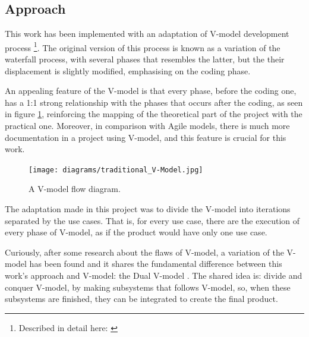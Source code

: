 \subsection{Approach}
This work has been implemented with an adaptation of V-model development process
\footnote{Described in detail here: \cite{mathur2010advancements}}.
The original version of this process is known as a variation of the waterfall process,
with several phases that resembles the latter,
but the their displacement is slightly modified,
emphasising on the coding phase.

An appealing feature of the V-model is that every phase,
before the coding one,
has a 1:1 strong relationship with the phases that occurs after the coding,
as seen in figure \ref{fig:v-model},
reinforcing the mapping of the theoretical part of the project with the practical one.
Moreover,
in comparison with Agile models,
there is much more documentation in a project using V-model,
and this feature is crucial for this work.

\begin{figure}[h]
    \centering
    \texttt{[image: diagrams/traditional\_V-Model.jpg]}
    \caption{A V-model flow diagram. \cite{vmodelCMU}}
    \label{fig:v-model}
\end{figure}

The adaptation made in this project was to divide the V-model into iterations separated by the use cases.
That is,
for every use case,
there are the execution of every phase of V-model,
as if the product would have only one use case.

Curiously,
after some research about the flaws of V-model,
a variation of the V-model has been found and it shares the fundamental difference between this work's approach and V-model:
the Dual V-model \cite{clark2009system}.
The shared idea is: divide and conquer V-model, 
by making subsystems that follows V-model,
so,
when these subsystems are finished,
they can be integrated to create the final product.


